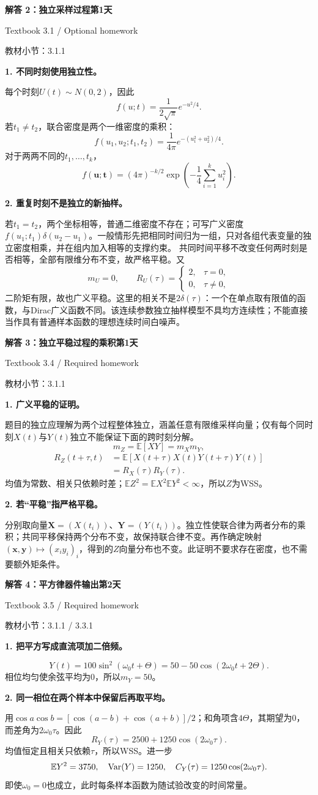 \documentclass[10.5pt,fontset=fandol]{ctexart}
\newcommand{\E}{\mathbb E}\newcommand{\ee}{\mathrm e}\newcommand{\jj}{\mathrm j}
\newcommand{\qtitle}[2]{\par\addvspace{.85em}\Needspace{10\baselineskip}\begin{tcolorbox}[colback=navy,colframe=navy,arc=1.5pt,boxrule=0pt]\color{white}\large\bfseries #1\hfill\small #2\end{tcolorbox}}
\newcommand{\step}[1]{\par\addvspace{.4em}\Needspace{4\baselineskip}\textbf{#1}\par}\hypersetup{pdftitle={SSA Chapter 3 Review Solutions - Chinese}}
\begin{document}
\qtitle{解答 2：独立采样过程}{第1天}
{\small\color{accentred}Textbook 3.1 / Optional homework}\par{\small\color{muted}教材小节：3.1.1}\par\smallskip\step{1. 不同时刻使用独立性。}
每个时刻$U(t)\sim N(0,2)$，因此
\[f(u;t)=\frac1{2\sqrt\pi}e^{-u^2/4}.\]
若$t_1\ne t_2$，联合密度是两个一维密度的乘积：
\[f(u_1,u_2;t_1,t_2)=\frac1{4\pi}e^{-(u_1^2+u_2^2)/4}.\]
对于两两不同的$t_1,\ldots,t_k$，
\[\boxed{f(\boldsymbol u;\boldsymbol t)=(4\pi)^{-k/2}\exp\left(-\frac14\sum_{i=1}^ku_i^2\right)}.\]
\step{2. 重复时刻不是独立的新抽样。}
若$t_1=t_2$，两个坐标相等，普通二维密度不存在；可写广义密度$f(u_1;t_1)\delta(u_2-u_1)$。一般情形先把相同时间归为一组，只对各组代表变量的独立密度相乘，并在组内加入相等的支撑约束。
共同时间平移不改变任何两时刻是否相等，全部有限维分布不变，故严格平稳。又
\[m_U=0,\qquad R_U(\tau)=\begin{cases}2,&\tau=0,\\0,&\tau\ne0,\end{cases}\]
二阶矩有限，故也广义平稳。这里的相关不是$2\delta(\tau)$：一个在单点取有限值的函数，与Dirac广义函数不同。该连续参数独立抽样模型不具均方连续性；不能直接当作具有普通样本函数的理想连续时间白噪声。

\qtitle{解答 3：独立平稳过程的乘积}{第1天}
{\small\color{accentred}Textbook 3.4 / Required homework}\par{\small\color{muted}教材小节：3.1.1}\par\smallskip\step{1. 广义平稳的证明。}
题目的独立应理解为两个过程整体独立，涵盖任意有限维采样向量；仅有每个同时刻$X(t)$与$Y(t)$独立不能保证下面的跨时刻分解。
\[m_Z=\E[XY]=m_Xm_Y,\]
\[\begin{aligned}R_Z(t+\tau,t)&=\E[X(t+\tau)X(t)Y(t+\tau)Y(t)]\\&=R_X(\tau)R_Y(\tau).\end{aligned}\]
均值为常数、相关只依赖时差；$\E Z^2=\E X^2\E Y^2<\infty$，所以$Z$为WSS。
\step{2. 若“平稳”指严格平稳。}
分别取向量$\boldsymbol X=(X(t_i))$、$\boldsymbol Y=(Y(t_i))$。独立性使联合律为两者分布的乘积；共同平移保持两个分布不变，故保持联合律不变。再作确定映射$(\boldsymbol x,\boldsymbol y)\mapsto(x_iy_i)_i$，得到的$Z$向量分布也不变。此证明不要求存在密度，也不需要额外矩条件。

\qtitle{解答 4：平方律器件输出}{第2天}
{\small\color{accentred}Textbook 3.5 / Required homework}\par{\small\color{muted}教材小节：3.1.1 / 3.3.1}\par\smallskip\step{1. 把平方写成直流项加二倍频。}
\[Y(t)=100\sin^2(\omega_0t+\Theta)=50-50\cos(2\omega_0t+2\Theta).\]
相位均匀使余弦平均为0，所以$\boxed{m_Y=50}$。
\step{2. 同一相位在两个样本中保留后再取平均。}
用$\cos a\cos b=[\cos(a-b)+\cos(a+b)]/2$；和角项含$4\Theta$，其期望为0，而差角为$2\omega_0\tau$。因此
\[\boxed{R_Y(\tau)=2500+1250\cos(2\omega_0\tau)}.\]
均值恒定且相关只依赖$\tau$，所以WSS。进一步
\[\E Y^2=3750,\quad \Var(Y)=1250,\quad C_Y(\tau)=1250\cos(2\omega_0\tau).\]
即使$\omega_0=0$也成立，此时每条样本函数为随试验改变的时间常量。
\end{document}
